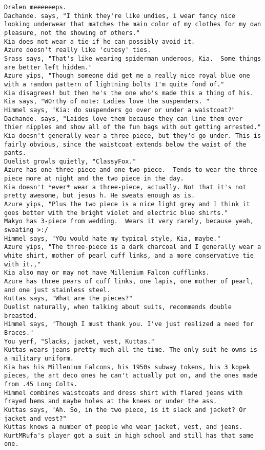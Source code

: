 \begin{verbatim}
Dralen meeeeeeps.
Dachande. says, "I think they're like undies, i wear fancy nice looking underwear that matches the main color of my clothes for my own pleasure, not the showing of others."
Kia does not wear a tie if he can possibly avoid it.
Azure doesn't really like 'cutesy' ties.
Srass says, "That's like wearing spiderman underoos, Kia.  Some things are better left hidden."
Azure yips, "Though someone did get me a really nice royal blue one with a random pattern of lightning bolts I'm quite fond of."
Kia disagrees! but then he's the one who's made this a thing of his.
Kia says, "WOrthy of note: Ladies love the suspenders. "
Himmel says, "Kia: do suspenders go over or under a waistcoat?"
Dachande. says, "Laides love them because they can line them over thier nipples and show all of the fun bags with out getting arrested."
Kia doesn't generally wear a three-piece, but they'd go under. This is fairly obvious, since the waistcoat extends below the waist of the pants.
Duelist growls quietly, "ClassyFox."
Azure has one three-piece and one two-piece.  Tends to wear the three piece more at night and the two piece in the day.
Kia doesn't *ever* wear a three-piece, actually. Not that it's not pretty awesome, but jesus h. He sweats enough as is.
Azure yips, "Plus the two piece is a nice light grey and I think it goes better with the bright violet and electric blue shirts."
Makyo has 3-piece from wedding.  Wears it very rarely, because yeah, sweating >:/
Himmel says, "YOu would hate my typical style, Kia, maybe."
Azure yips, "The three-piece is a dark charcoal and I generally wear a white shirt, mother of pearl cuff links, and a more conservative tie with it.,"
Kia also may or may not have Millenium Falcon cufflinks.
Azure has three pears of cuff links, one lapis, one mother of pearl, and one just stainless steel.
Kuttas says, "What are the pieces?"
Duelist naturally, when talking about suits, recommends double breasted.
Himmel says, "Though I must thank you. I've just realized a need for Braces."
You yerf, "Slacks, jacket, vest, Kuttas."
Kuttas wears jeans pretty much all the time. The only suit he owns is a military uniform.
Kia has his Millenium Falcons, his 1950s subway tokens, his 3 kopek pieces, the art deco ones he can't actually put on, and the ones made from .45 Long Colts.
Himmel combines waistcoats and dress shirt with flared jeans with frayed hems and maybe holes at the knees or under the ass.
Kuttas says, "Ah. So, in the two piece, is it slack and jacket? Or jacket and vest?"
Kuttas knows a number of people who wear jacket, vest, and jeans.
KurtMRufa's player got a suit in high school and still has that same one.

\end{verbatim}

